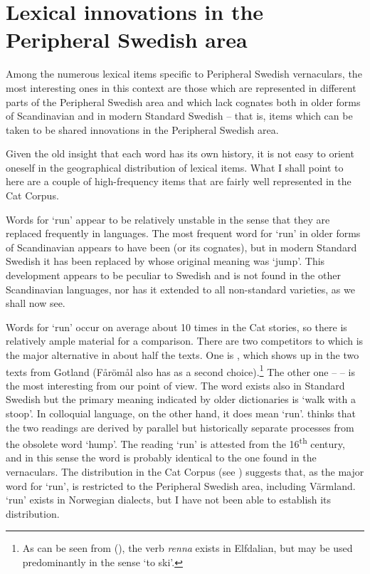 \section{Lexical innovations in the Peripheral Swedish area}

Among the numerous lexical items specific to Peripheral Swedish vernaculars, the most interesting ones in this context are those which are represented in different parts of the Peripheral Swedish area and which lack cognates both in older forms of Scandinavian and in modern Standard Swedish – that is, items which can be taken to be shared innovations in the Peripheral Swedish area. 

Given the old insight that each word has its own history, it is not easy to orient oneself in the geographical distribution of lexical items. What I shall point to here are a couple of high-frequency items that are fairly well represented in the Cat Corpus.

Words for ‘run’ appear to be relatively unstable in the sense that they are replaced frequently in languages. The most frequent word for ‘run’ in older forms of Scandinavian appears to have been (or its cognates), but in modern Standard Swedish it has been replaced by whose original meaning was ‘jump’. This development appears to be peculiar to Swedish and is not found in the other Scandinavian languages, nor has it extended to all non-standard varieties, as we shall now see. 

Words for ‘run’ occur on average about 10 times in the Cat stories, so there is relatively ample material for a comparison. There are two competitors to which is the major alternative in about half the texts. One is , which shows up in the two texts from Gotland (Fårömål also has  as a second choice).\footnote{ As can be seen from (), the verb \textit{renna} exists in Elfdalian, but may be used predominantly in the sense ‘to ski’.} The other one –  – is the most interesting from our point of view. The word exists also in Standard Swedish but the primary meaning indicated by older dictionaries is ‘walk with a stoop’. In colloquial language, on the other hand, it does mean ‘run’. \citet[371]{Hellquist1922} thinks that the two readings are derived by parallel but historically separate processes from the obsolete word  ‘hump’. The reading ‘run’ is attested from the 16\textsuperscript{th} century, and in this sense the word is probably identical to the one found in the vernaculars. The distribution in the Cat Corpus (see ) suggests that, as the major word for ‘run’,  is restricted to the Peripheral Swedish area, including Värmland.  ‘run’ exists in Norwegian dialects, but I have not been able to establish its distribution.

